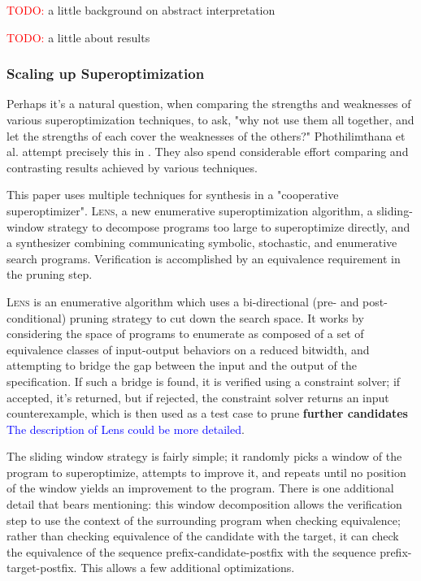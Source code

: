 \documentclass[12pt,twoside]{reedthesis}
\newcommand{\red}[1]{\textcolor{red}{#1}}
\newcommand{\comment}[2]{\textbf{#1} \textcolor{blue}{#2}}
\begin{document}
\red{TODO:} a little background on abstract interpretation

\red{TODO:} a little about results

\subsubsection{Scaling up Superoptimization}


Perhaps it's a natural question, when comparing the strengths and weaknesses of various superoptimization techniques, to ask, "why not use them all together, and let the strengths of each cover the weaknesses of the others?"
Phothilimthana et al. attempt precisely this in \cite{phothilimthana2016scaling}.
They also spend considerable effort comparing and contrasting results achieved by various techniques.
    
This paper uses multiple techniques for synthesis in a "cooperative superoptimizer".
\textsc{Lens}, a new enumerative superoptimization algorithm,
a sliding-window strategy to decompose programs too large to superoptimize directly,
and a synthesizer combining communicating symbolic, stochastic, and enumerative search programs.
Verification is accomplished by an equivalence requirement in the pruning step.
    
\textsc{Lens} is an enumerative algorithm which uses a bi-directional (pre- and post-conditional) pruning strategy to cut down the search space.
It works by considering the space of programs to enumerate as composed of a set of equivalence classes of input-output behaviors on a reduced bitwidth, and attempting to bridge the gap between the input and the output of the specification.
If such a bridge is found, it is verified using a constraint solver; if accepted, it's returned, but if rejected, the constraint solver returns an input counterexample, which is then used as a test case to prune \comment{further candidates}{The description of Lens could be more detailed}.

The sliding window strategy is fairly simple; it randomly picks a window of the program to superoptimize, attempts to improve it, and repeats until no position of the window yields an improvement to the program.
There is one additional detail that bears mentioning: 
this window decomposition allows the verification step to use the context of the surrounding program when checking equivalence; rather than checking equivalence of the candidate with the target, it can check the equivalence of the sequence prefix-candidate-postfix with the sequence prefix-target-postfix.
This allows a few additional optimizations.
\end{document}
